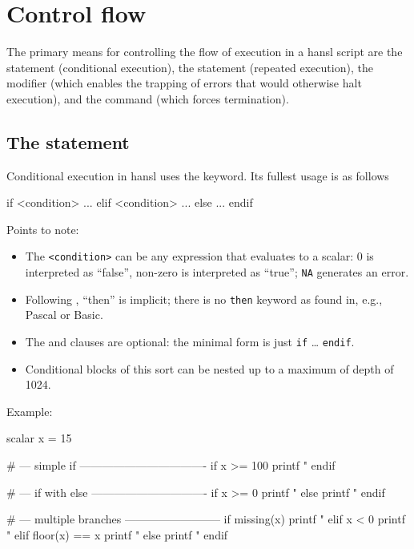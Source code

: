 \chapter{Control flow}
\label{chap:hp-ctrlflow}

The primary means for controlling the flow of execution in a hansl
script are the  statement (conditional execution), the
 statement (repeated execution), the  modifier
(which enables the trapping of errors that would otherwise halt
execution), and the  command (which forces termination).

\section{The  statement}

Conditional execution in hansl uses the  keyword. Its fullest
usage is as follows
\begin{code}
if <condition>
   ...
elif <condition>
   ...
else 
   ...
endif  
\end{code}

Points to note:
\begin{itemize}
\item The \texttt{<condition>} can be any expression that evaluates to a
  scalar: 0 is interpreted as ``false'', non-zero is interpreted as
  ``true''; \texttt{NA} generates an error.
\item Following , ``then'' is implicit; there is no \texttt{then}
  keyword as found in, e.g., Pascal or Basic.
\item The  and  clauses are optional: the minimal
  form is just \texttt{if} \dots{} \texttt{endif}.
\item Conditional blocks of this sort can be nested up to a maximum of
  depth of 1024.
\end{itemize}

Example:
\begin{code}
scalar x = 15

# --- simple if ----------------------------------
if x >= 100
   printf "%
endif

# --- if with else -------------------------------
if x >= 0
   printf "%
else
   printf "%
endif

# --- multiple branches --------------------------
if missing(x)
   printf "%
elif x < 0
   printf "%
elif floor(x) == x
   printf "%
else
   printf "%
endif
\end{code}

